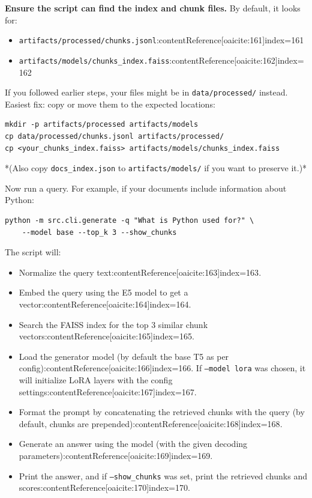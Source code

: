 \documentclass{article}
\begin{document}
\textbf{Ensure the script can find the index and chunk files.} By default, it looks for:
\begin{itemize}
    \item \texttt{artifacts/processed/chunks.jsonl}:contentReference[oaicite:161]{index=161}
    \item \texttt{artifacts/models/chunks\_index.faiss}:contentReference[oaicite:162]{index=162}
\end{itemize}
If you followed earlier steps, your files might be in \texttt{data/processed/} instead. Easiest fix: copy or move them to the expected locations:
\begin{verbatim}
mkdir -p artifacts/processed artifacts/models
cp data/processed/chunks.jsonl artifacts/processed/
cp <your_chunks_index.faiss> artifacts/models/chunks_index.faiss
\end{verbatim}
*(Also copy \texttt{docs\_index.json} to \texttt{artifacts/models/} if you want to preserve it.)*

Now run a query. For example, if your documents include information about Python:
\begin{verbatim}
python -m src.cli.generate -q "What is Python used for?" \
    --model base --top_k 3 --show_chunks
\end{verbatim}
The script will:
\begin{itemize}
    \item Normalize the query text:contentReference[oaicite:163]{index=163}.
    \item Embed the query using the E5 model to get a vector:contentReference[oaicite:164]{index=164}.
    \item Search the FAISS index for the top 3 similar chunk vectors:contentReference[oaicite:165]{index=165}.
    \item Load the generator model (by default the base T5 as per config):contentReference[oaicite:166]{index=166}. If \texttt{--model lora} was chosen, it will initialize LoRA layers with the config settings:contentReference[oaicite:167]{index=167}.
    \item Format the prompt by concatenating the retrieved chunks with the query (by default, chunks are prepended):contentReference[oaicite:168]{index=168}.
    \item Generate an answer using the model (with the given decoding parameters):contentReference[oaicite:169]{index=169}.
    \item Print the answer, and if \texttt{--show\_chunks} was set, print the retrieved chunks and scores:contentReference[oaicite:170]{index=170}.
\end{itemize}
\end{document}
